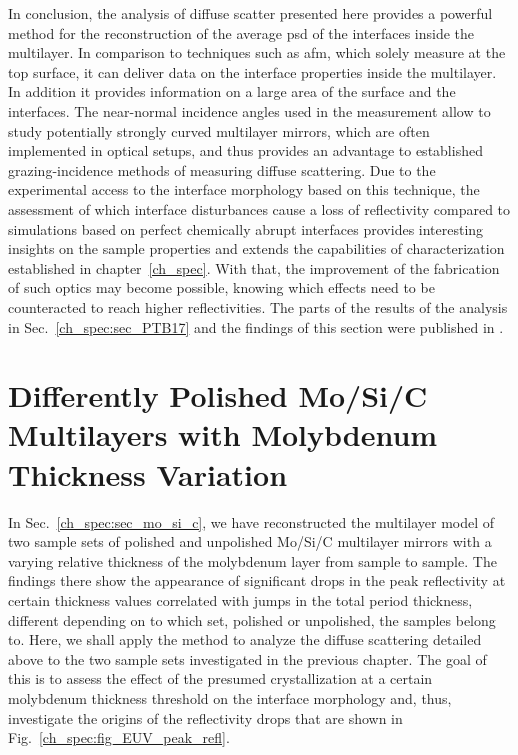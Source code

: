 In conclusion, the analysis of diffuse scatter presented here provides a powerful method for the reconstruction of the average \gls{psd} of the interfaces inside the multilayer. In comparison to techniques such as \gls{afm}, which solely measure at the top surface, it can deliver data on the interface properties inside the multilayer. In addition it provides information on a large area of the surface and the interfaces. The near-normal incidence angles used in the measurement allow to study potentially strongly curved multilayer mirrors, which are often implemented in optical setups, and thus provides an advantage to established grazing-incidence methods of measuring diffuse scattering. Due to the experimental access to the interface morphology based on this technique, the assessment of which interface disturbances cause a loss of reflectivity compared to simulations based on perfect chemically abrupt interfaces provides interesting insights on the sample properties and extends the capabilities of characterization established in chapter~\ref{ch_spec}. With that, the improvement of the fabrication of such optics may become possible, knowing which effects need to be counteracted to reach higher reflectivities. The parts of the results of the analysis in Sec.~\ref{ch_spec:sec_PTB17} and the findings of this section were published in .

\section{Differently Polished Mo/Si/C Multilayers with Molybdenum Thickness Variation} \label{ch_diff:sec_mo_si_c}
In Sec.~\ref{ch_spec:sec_mo_si_c}, we have reconstructed the multilayer model of two sample sets of polished and unpolished Mo/Si/C multilayer mirrors with a varying relative thickness of the molybdenum layer from sample to sample. The findings there show the appearance of significant drops in the peak reflectivity at certain thickness values correlated with jumps in the total period thickness, different depending on to which set, polished or unpolished, the samples belong to. Here, we shall apply the method to analyze the diffuse scattering detailed above to the two sample sets investigated in the previous chapter. The goal of this is to assess the effect of the presumed crystallization at a certain molybdenum thickness threshold on the interface morphology and, thus, investigate the origins of the reflectivity drops that are shown in Fig.~\ref{ch_spec:fig_EUV_peak_refl}.

